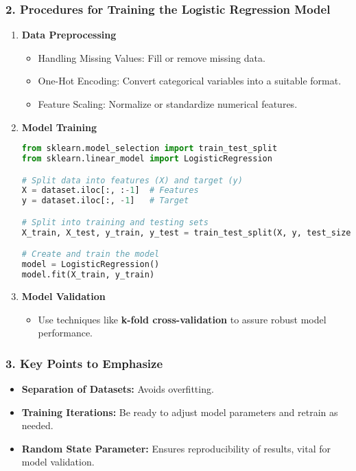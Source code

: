 \documentclass[aspectratio=169]{beamer}
\begin{document}
\begin{frame}[fragile]
    \frametitle{2. Procedures for Training the Logistic Regression Model}
    \begin{enumerate}
        \item \textbf{Data Preprocessing}
            \begin{itemize}
                \item Handling Missing Values: Fill or remove missing data.
                \item One-Hot Encoding: Convert categorical variables into a suitable format.
                \item Feature Scaling: Normalize or standardize numerical features.
            \end{itemize}
        
        \item \textbf{Model Training}
            \begin{lstlisting}[language=Python]
from sklearn.model_selection import train_test_split
from sklearn.linear_model import LogisticRegression

# Split data into features (X) and target (y)
X = dataset.iloc[:, :-1]  # Features
y = dataset.iloc[:, -1]   # Target

# Split into training and testing sets
X_train, X_test, y_train, y_test = train_test_split(X, y, test_size=0.2, random_state=42)

# Create and train the model
model = LogisticRegression()
model.fit(X_train, y_train)
            \end{lstlisting}

        \item \textbf{Model Validation}
            \begin{itemize}
                \item Use techniques like \textbf{k-fold cross-validation} to assure robust model performance.
            \end{itemize}
    \end{enumerate}
\end{frame}

\begin{frame}[fragile]
    \frametitle{3. Key Points to Emphasize}
    \begin{itemize}
        \item \textbf{Separation of Datasets:} Avoids overfitting.
        \item \textbf{Training Iterations:} Be ready to adjust model parameters and retrain as needed.
        \item \textbf{Random State Parameter:} Ensures reproducibility of results, vital for model validation.
    \end{itemize}
\end{frame}
\end{document}
